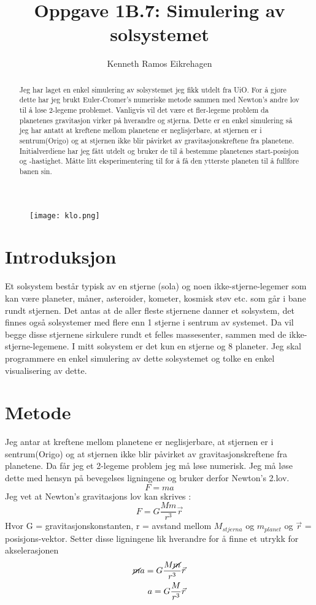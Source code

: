 \documentclass[12pt,preprint]{aastex6}
\begin{document}
\title{Oppgave 1B.7: Simulering av solsystemet}

\author{Kenneth Ramos Eikrehagen}


\newpage

\begin{abstract}
Jeg har laget en enkel simulering av solsystemet jeg fikk utdelt fra UiO. For å gjøre dette har jeg brukt Euler-Cromer's numeriske metode sammen med Newton's andre lov til å løse 2-legeme problemet. Vanligvis vil det være et fler-legeme problem da planetenes gravitasjon virker på hverandre og stjerna. Dette er en enkel simulering så jeg har antatt at kreftene mellom planetene er neglisjerbare, at stjernen er i sentrum(Origo) og at stjernen ikke blir påvirket av gravitasjonskreftene fra planetene. Initialverdiene har jeg fått utdelt og bruker de til å bestemme planetenes start-posisjon og -hastighet. Måtte litt eksperimentering til for å få den ytterste planeten til å fullføre banen sin. 
\end{abstract}

\begin{figure}
\texttt{[image: klo.png]} 
\label{6}
\end{figure}

\section{Introduksjon}
\label{sect:intro}
Et solsystem består typisk av en stjerne (sola) og noen ikke-stjerne-legemer som kan være planeter, måner, asteroider, kometer, kosmisk støv etc. som går i bane rundt stjernen. Det antas at de aller fleste stjernene danner et solsystem, det finnes også solsystemer med flere enn 1 stjerne i sentrum av systemet. Da vil begge disse stjernene sirkulere rundt et felles massesenter, sammen med de ikke-stjerne-legemene. I mitt solsystem er det kun en stjerne og 8 planeter. Jeg skal programmere en enkel simulering av dette solsystemet og tolke en enkel visualisering av dette. 

\section{Metode}
Jeg antar at kreftene mellom planetene er neglisjerbare, at stjernen er i sentrum(Origo) og at stjernen ikke blir påvirket av gravitasjonskreftene fra planetene. Da får jeg et 2-legeme problem jeg må løse numerisk. Jeg må løse dette med hensyn på bevegelses ligningene og bruker derfor Newton's 2.lov. 
$$F = ma$$ 
Jeg vet at Newton's gravitasjons lov kan skrives :
$$F = G\frac{Mm}{r^3}\vec{r} $$
Hvor G = gravitasjonskonstanten, r = avstand mellom $M_{stjerna}$ og $m_{planet}$ og $\vec{r}$ = posisjons-vektor.
Setter disse ligningene lik hverandre for å finne et utrykk for akselerasjonen
\begin{align*}
\cancel{m}a =  G\frac{M\cancel{m}}{r^3}\vec{r}\\
a =  G\frac{M}{r^3}\vec{r}
\end{align*}
\end{document}
